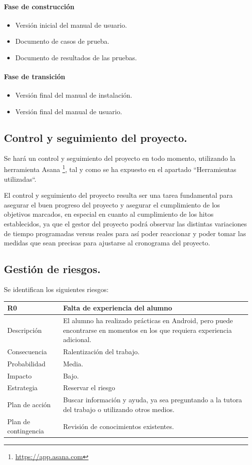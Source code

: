 \documentclass[twoside]{report}
\newcommand\addrow[2]{#1 &#2\\ }
\newcommand\addheading[2]{#1 &#2\\ \hline}
\newcommand\tabularhead{\begin{tabular}{lp{0.7\textwidth}}
\hline
}
\newenvironment{risk}{\tabularhead}
{\hline\end{tabular}}
\begin{document}
\paragraph{Fase de construcción\\}
\begin{itemize}
\item Versión inicial del manual de usuario.
\item Documento de casos de prueba.
\item Documento de resultados de las pruebas.
\end{itemize}

\paragraph{Fase de transición\\}
\begin{itemize}
\item Versión final del manual de instalación.
\item Versión final del manual de usuario.
\end{itemize}

\subsection{Control y seguimiento del proyecto.}

Se hará un control y seguimiento del proyecto en todo momento, utilizando la herramienta Asana \footnote{\url{https://app.asana.com}}, tal y como se ha expuesto en el apartado “Herramientas utilizadas“.

El control y seguimiento del proyecto resulta ser una tarea fundamental para asegurar el buen progreso del proyecto y asegurar el cumplimiento de los objetivos marcados, en especial en cuanto al cumplimiento de los hitos establecidos, ya que el gestor del proyecto podrá observar las distintas variaciones de tiempo programadas versus reales para así poder reaccionar y poder tomar las medidas que sean precisas para ajustarse al cronograma del proyecto.

\subsection{Gestión de riesgos.}

Se identifican los siguientes riesgos:

\begin{risk}
  \addheading{R0}{Falta de experiencia del alumno}
  \addrow{Descripción}{El alumno ha realizado prácticas en Android, pero puede encontrarse en momentos en los que requiera experiencia adicional.}
  \addrow{Consecuencia}{Ralentización del trabajo.}
  \addrow{Probabilidad}{Media.}
  \addrow{Impacto}{Bajo.}
  \addrow{Estrategia}{Reservar el riesgo}
  \addrow{Plan de acción}{Buscar información y ayuda, ya sea preguntando a la tutora del trabajo o utilizando otros medios.}
  \addrow{Plan de contingencia}{Revisión de conocimientos existentes.}
\end{risk}
\end{document}
